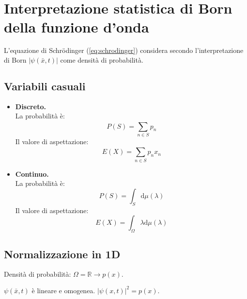 \chapter[Interpretazione statistica di Born]{Interpretazione statistica di Born della funzione d'onda} %
L'equazione di Schrödinger (\ref{eq:schrodinger}) considera secondo l'interpretazione di Born $|\psi \left(\bar x,t\right)|$ come densità di probabilità.

\section{Variabili casuali} %
\begin{itemize}
\item \textbf{Discreto.}\\
La probabilità è:
\begin{equation}
P\left(S\right)=\sum_{n\in S}^{}p_n
\end{equation}
Il valore di aspettazione:
\begin{equation}
E\left(X\right)=\sum_{n\in S}^{}p_n x_n
\end{equation}
\item \textbf{Continuo.}\\
La probabilità è:
\begin{equation}
P\left(S\right)=\int_{S}^{}{\textrm{d}\mu\left(\lambda\right)}
\end{equation}
Il valore di aspettazione:
\begin{equation}
E\left(X\right)=\int_{\Omega}^{}{\lambda \textrm{d}\mu(\lambda)}
\end{equation}
\end{itemize}

\section{Normalizzazione in 1D} %
Densità di probabilità: $\Omega=\mathbb{R} \rightarrow p(x)$.

$\psi \left(\bar x,t\right)$ è lineare e omogenea. $|\psi \left( x,t\right)|^2=p\left( x\right)$.

